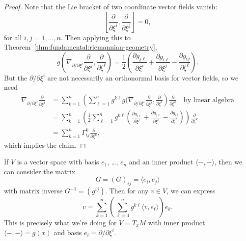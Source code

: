 \begin{proof}
Note that the Lie bracket of two coordinate vector fields vanish:
\begin{equation}
\left[\frac{\partial}{\partial\xi^{i}},\frac{\partial}{\partial\xi^{j}}\right]=0,
\end{equation}
for all $i,j=1,\dots,n$. Then applying this to Theorem~\ref{thm:fundamental:riemannian-geometry},
\begin{equation}
g(\nabla_{\partial/\partial\xi^{i}}\frac{\partial}{\partial\xi^{j}},\frac{\partial}{\partial\xi^{\ell}})=\frac{1}{2}\left(\frac{\partial g_{j\ell}}{\partial\xi^{i}}
+\frac{\partial g_{i\ell}}{\partial\xi^{j}}-\frac{\partial g_{ij}}{\partial\xi^{\ell}}\right).
\end{equation}
But the $\partial/\partial\xi^{i}$ are not necessarily an orthonormal
basis for vector fields, so we need
\begin{subequations}
  \begin{align}
\nabla_{\partial/\partial\xi^{i}}\frac{\partial}{\partial\xi^{j}}
&=\sum^{n}_{k=1}\left(\sum^{n}_{\ell=1}g^{k\ell}g(\nabla_{\partial/\partial\xi^{i}}\frac{\partial}{\partial\xi^{j}},\frac{\partial}{\partial\xi^{\ell}}\right)\frac{\partial}{\partial\xi^{k}}
\quad\mbox{by linear algebra}\\
&=\sum^{n}_{k=1}\left(\frac{1}{2}\sum^{n}_{\ell=1}%
g^{k\ell}\left(\frac{\partial g_{i\ell}}{\partial\xi^{j}}
  +\frac{\partial g_{j\ell}}{\partial\xi^{i}}
  -\frac{\partial g_{ij}}{\partial\xi^{\ell}}\right)\right)%
  \frac{\partial}{\partial\xi^{k}}\\
&=\sum^{n}_{k=1}\Gamma^{k}_{ij}\frac{\partial}{\partial\xi^{k}},
  \end{align}
\end{subequations}
which implies the claim.
\end{proof}

\begin{remark}
If $V$ is a vector space with basis $e_{1}$, \dots, $e_{n}$ and an
inner product $\langle-,-\rangle$, then we can consider the matrix
\begin{equation}
G=(G)_{ij}=\langle e_{i},e_{j}\rangle
\end{equation}
with matrix inverse $G^{-1}=(g^{ij})$. Then for any $v\in V$, we can
express
\begin{equation}
v=\sum^{n}_{k=1}\left(\sum^{n}_{\ell=1}g^{k\ell}\langle v,e_{\ell}\rangle\right)e_{k}.
\end{equation}
This is precisely what we're doing for $V=T_{x}M$ with inner product
$\langle-,-\rangle=g(x)$ and basis $e_{i}=\partial/\partial\xi^{i}$.
\end{remark}

